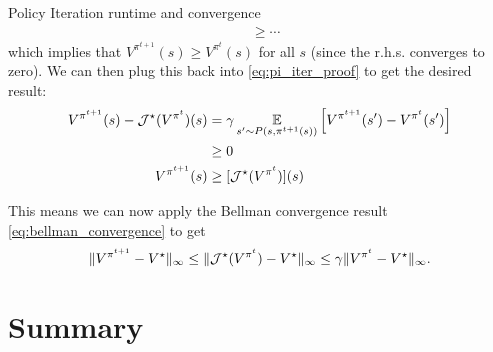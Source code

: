 \documentclass[\main/main]{subfiles}
\begin{document}
\begin{theorem}{Policy Iteration runtime and convergence}
\begin{align*}
    &\ge \cdots
\end{align*}
which implies that $V^{\pi^{t+1}}(s) \ge V^{\pi^{t}}(s)$ for all $s$ (since the r.h.s. converges to zero). We can then plug this back into \eqref{eq:pi_iter_proof} to get the desired result:
\begin{align*}
    V^{\pi^{t+1}}(s) - \mathcal{J}^{\star} (V^{\pi^{t}})(s) &= \gamma \operatorname*{\mathbb{E}}_{s' \sim P(s, \pi^{t+1}(s))} \left[V^{\pi^{t+1}}(s') -  V^{\pi^{t}}(s') \right] \\
    &\ge 0 \\
    V^{\pi^{t+1}}(s) &\ge [\mathcal{J}^{\star}(V^{\pi^{t}})](s)
\end{align*}

This means we can now apply the Bellman convergence result \eqref{eq:bellman_convergence} to get
\[
    \|V^{\pi^{t+1}} - V^\star \|_{\infty} \le \|\mathcal{J}^{\star} (V^{\pi^{t}}) - V^{\star}\|_{\infty} \le \gamma \|V^{\pi^{t}} - V^\star \|_{\infty}.
\]
\end{theorem}

\section{Summary}
\end{document}
